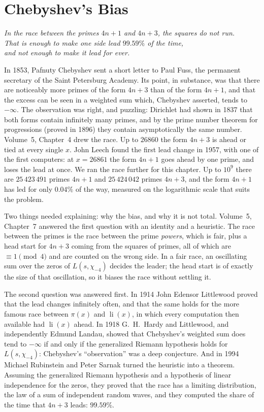 \chapter{Chebyshev's Bias}\label{ch:bias}
\begin{center}\itshape
In the race between the primes $4n+1$ and $4n+3$, the squares do not run.\\
That is enough to make one side lead $99.59\%$ of the time,\\
and not enough to make it lead for ever.
\end{center}

In 1853, Pafnuty Chebyshev sent a short letter to Paul Fuss, the permanent secretary of the Saint Petersburg Academy. Its point, in substance, was that there are noticeably more primes of the form $4n+3$ than of the form $4n+1$, and that the excess can be seen in a weighted sum which, Chebyshev asserted, tends to $-\infty$. The observation was right, and puzzling: Dirichlet had shown in 1837 that both forms contain infinitely many primes, and by the prime number theorem for progressions (proved in 1896) they contain asymptotically the same number. Volume~5, Chapter~4 drew the race. Up to $26860$ the form $4n+3$ is ahead or tied at every single $x$. John Leech found the first lead change in 1957, with one of the first computers: at $x=26861$ the form $4n+1$ goes ahead by one prime, and loses the lead at once. We ran the race further for this chapter. Up to $10^9$ there are $25\,423\,491$ primes $4n+1$ and $25\,424\,042$ primes $4n+3$, and the form $4n+1$ has led for only $0.04\%$ of the way, measured on the logarithmic scale that suits the problem.

Two things needed explaining: why the bias, and why it is not total. Volume~5, Chapter~7 answered the first question with an identity and a heuristic. The race between the primes is the race between the prime \emph{powers}, which is fair, plus a head start for $4n+3$ coming from the squares of primes, all of which are $\equiv1\pmod4$ and are counted on the wrong side. In a fair race, an oscillating sum over the zeros of $L(s,\chi_{-4})$ decides the leader; the head start is of exactly the size of that oscillation, so it biases the race without settling it.

The second question was answered first. In 1914 John Edensor Littlewood proved that the lead changes infinitely often, and that the same holds for the more famous race between $\pi(x)$ and $\operatorname{li}(x)$, in which every computation then available had $\operatorname{li}(x)$ ahead. In 1918 G.~H.~Hardy and Littlewood, and independently Edmund Landau, showed that Chebyshev's weighted sum does tend to $-\infty$ if and only if the generalized Riemann hypothesis holds for $L(s,\chi_{-4})$: Chebyshev's ``observation'' was a deep conjecture. And in 1994 Michael Rubinstein and Peter Sarnak turned the heuristic into a theorem. Assuming the generalized Riemann hypothesis and a hypothesis of linear independence for the zeros, they proved that the race has a limiting distribution, the law of a sum of independent random waves, and they computed the share of the time that $4n+3$ leads: $99.59\%$.

